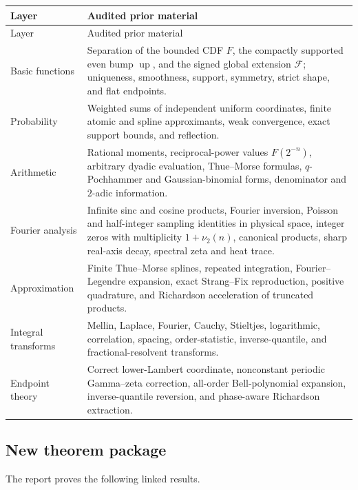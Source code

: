\documentclass[11pt,oneside]{article}
\theoremstyle{definition}
\newcommand{\Up}{\operatorname{up}}
\newcommand{\vtwo}{\nu_2}
\begin{document}
\begin{longtable}{@{}p{}p{}@{}}
\toprule
Layer & Audited prior material \\
\midrule
\endfirsthead
\toprule
Layer & Audited prior material \\
\midrule
\endhead
Basic functions & Separation of the bounded CDF $F$, the compactly supported even bump $\Up$, and the signed global extension $\mathcal F$; uniqueness, smoothness, support, symmetry, strict shape, and flat endpoints.\\
Probability & Weighted sums of independent uniform coordinates, finite atomic and spline approximants, weak convergence, exact support bounds, and reflection.\\
Arithmetic & Rational moments, reciprocal-power values $F(2^{-n})$, arbitrary dyadic evaluation, Thue--Morse formulas, $q$-Pochhammer and Gaussian-binomial forms, denominator and $2$-adic information.\\
Fourier analysis & Infinite sinc and cosine products, Fourier inversion, Poisson and half-integer sampling identities in physical space, integer zeros with multiplicity $1+\vtwo(n)$, canonical products, sharp real-axis decay, spectral zeta and heat trace.\\
Approximation & Finite Thue--Morse splines, repeated integration, Fourier--Legendre expansion, exact Strang--Fix reproduction, positive quadrature, and Richardson acceleration of truncated products.\\
Integral transforms & Mellin, Laplace, Fourier, Cauchy, Stieltjes, logarithmic, correlation, spacing, order-statistic, inverse-quantile, and fractional-resolvent transforms.\\
Endpoint theory & Correct lower-Lambert coordinate, nonconstant periodic Gamma--zeta correction, all-order Bell-polynomial expansion, inverse-quantile reversion, and phase-aware Richardson extraction.\\
\bottomrule
\end{longtable}

\subsection{New theorem package}

The report proves the following linked results.
\end{document}
